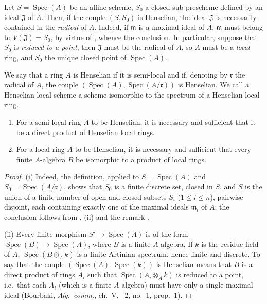 \begin{remark}[18.5.7]
\label{IV.18.5.7}
Let $S=\operatorname{Spec}(A)$ be an affine scheme, $S_0$ a closed sub-prescheme defined by an ideal $\mathfrak{J}$ of $A$.
Then, if the couple $(S,S_0)$ is Henselian, the ideal $\mathfrak{J}$ is necessarily contained in the \emph{radical} of $A$.
Indeed, if $\mathfrak{m}$ is a maximal ideal of $A$, $\mathfrak{m}$ must belong to $V(\mathfrak{J})=S_0$, by virtue of , whence the conclusion.
In particular, suppose that $S_0$ is \emph{reduced to a point}, then $\mathfrak{J}$ must be the radical of $A$, so $A$ must be a \emph{local} ring, and $S_0$ the unique closed point of $\operatorname{Spec}(A)$.
\end{remark}

\begin{definition}[18.5.8]
\label{IV.18.5.8}
We say that a ring $A$ is Henselian if it is semi-local and if, denoting by $\mathfrak{r}$ the radical of $A$, the couple $(\operatorname{Spec}(A),\operatorname{Spec}(A/\mathfrak{r}))$ is Henselian.
We call a Henselian local scheme a scheme isomorphic to the spectrum of a Henselian local ring.
\end{definition}

\begin{proposition}[18.5.9]
\label{IV.18.5.9}
\begin{enumerate}
  \item[\textup{(i)}] For a semi-local ring $A$ to be Henselian, it is necessary and sufficient that it be a direct product of Henselian local rings.
  \item[\textup{(ii)}] For a local ring $A$ to be Henselian, it is necessary and sufficient that every finite $A$-algebra $B$ be isomorphic to a product of \textup{local} rings.
\end{enumerate}
\end{proposition}

\begin{proof}
(i) Indeed, the definition, applied to $S=\operatorname{Spec}(A)$ and $S_0=\operatorname{Spec}(A/\mathfrak{r})$, shows that $S_0$ is a finite discrete set, closed in $S$, and $S$ is the union of a finite number of open and closed subsets $S_i$ ($1\leq i\leq n$), pairwise disjoint, each containing exactly one of the maximal ideals $\mathfrak{m}_i$ of $A$;
the conclusion follows from , (ii) and the remark .

(ii) Every finite morphism $S'\to\operatorname{Spec}(A)$ is of the form $\operatorname{Spec}(B)\to\operatorname{Spec}(A)$, where $B$ is a finite $A$-algebra.
If $k$ is the residue field of $A$, $\operatorname{Spec}(B\otimes_A k)$ is a finite Artinian spectrum, hence finite and discrete.
To say that the couple $(\operatorname{Spec}(A),\operatorname{Spec}(k))$ is Henselian means that $B$ is a direct product of rings $A_i$ such that $\operatorname{Spec}(A_i\otimes_A k)$ is reduced to a point, i.e.\ that each $A_i$ (which is a finite $A$-algebra) must have only a single maximal ideal (Bourbaki, \emph{Alg.\ comm.}, ch.~V, \textsection~2, no.~1, prop.~1).
\end{proof}

